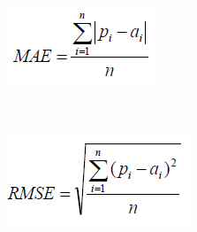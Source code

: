 \documentclass[a4paper,12pt, english]{article}
\begin{document}
\begin{enumerate}
\begin{enumerate}
      
\begin{figure}[h]
        \centering
        \begin{subfigure}[b]{0.23\textwidth}
                \includegraphics[width=\textwidth]{../figs/MAE}
                \label{fig:mae}
        \end{subfigure} \quad %
        ~ %
        \begin{subfigure}[b]{0.23\textwidth}
                \includegraphics[width=\textwidth]{../figs/RMSE}
                \label{fig:rmse}
        \end{subfigure} 
        

\end{figure}
\end{enumerate}
\end{enumerate}
\end{document}
